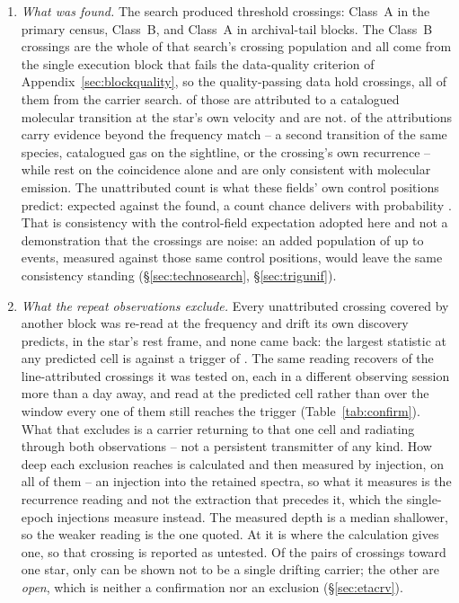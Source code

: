 \begin{enumerate}[leftmargin=1.6em,itemsep=4pt,topsep=4pt,parsep=0pt]
\item \emph{What was found.} The search produced \EvNCrossRaw{} threshold
crossings: \CkNCrossCenA{} Class~A in the primary census, \PrFlagXrossWord{}
Class~B, and \CeNTailCrossWord{} Class~A in archival-tail blocks. The
\PrFlagXrossWord{} Class~B crossings are the whole of that search's crossing
population and all come from the single execution block that fails the
data-quality criterion of Appendix~\ref{sec:blockquality}, so the
quality-passing data hold \EvNCrossQp{} crossings, all of them from the
carrier search. \EvNAttrQp{} of those are attributed to
a catalogued molecular transition at the star's own velocity and
\EvNUnattrQp{} are not.
\LnAttrSupp{} of the \EvNAttrQp{} attributions carry evidence beyond the
frequency match -- a second transition of the same species, catalogued gas on
the sightline, or the crossing's own recurrence -- while \LnAttrCoincWord{}
rest on the coincidence alone and are only consistent with molecular
emission. The unattributed count is what these fields' own control positions
predict: \CeExp{} expected against the \CeObs{} found, a count chance
delivers with probability \CeProbNull. That is consistency with the
control-field expectation adopted here and not a demonstration that the
crossings are noise: an added population of up to \CeAddLim{} events,
measured against those same control positions, would leave the same
consistency standing (\S\ref{sec:technosearch}, \S\ref{sec:trigunif}).

\item \emph{What the repeat observations exclude.} Every unattributed crossing
covered by another block was re-read at the frequency and drift its own
discovery predicts, in the star's rest frame, and none came back: the largest statistic
at any predicted cell is \RcTMax{} against a trigger of \StageNullTrig. The
same reading recovers \MkAttrRecur{} of the \MkAttrTested{} line-attributed
crossings it was tested on, each in a different observing session more than a
day away, and read at the predicted cell rather than over the window every
one of them still reaches the trigger (Table~\ref{tab:confirm}). What
that excludes is a carrier returning to that one cell and radiating through
both observations -- not a persistent transmitter of any kind. How deep each
exclusion reaches is calculated and then measured by injection, on all
\HjNMeas{} of them -- an injection into the retained spectra, so what it
measures is the recurrence reading and not the extraction that precedes it,
which the single-epoch injections measure instead. The measured depth is a
median \HjDevMed{} shallower, so
the weaker reading is the one quoted. At \HjEtaStar{} it is \HjEtaMeas{}
where the calculation gives one, so that crossing is reported as untested.
Of the
\TjNPair{} pairs of crossings toward one star, only \TjNExcl{} can be shown
not to be a single drifting carrier; the other \TjNOpen{} are \emph{open},
which is neither a confirmation nor an exclusion
(\S\ref{sec:etacrv}).


\end{enumerate}
